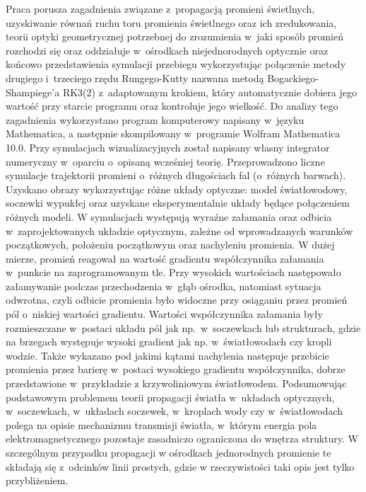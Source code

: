 \documentclass[a4paper,12pkt]{report}
\begin{document}
\indent Praca porusza zagadnienia związane z~propagacją promieni świetlnych, uzyskiwanie równań ruchu toru promienia świetlnego oraz ich zredukowania, teorii optyki geometrycznej potrzebnej do zrozumienia w~jaki sposób promień rozchodzi się oraz oddziałuje w~ośrodkach niejednorodnych optycznie oraz końcowo przedstawienia symulacji przebiegu wykorzystując połączenie metody drugiego i~trzeciego rzędu Rungego-Kutty nazwana metodą Bogackiego-Shampiege’a RK3(2) z~adaptowanym krokiem, który automatycznie dobiera jego wartość przy starcie programu oraz kontroluje jego wielkość. Do analizy tego zagadnienia wykorzystano program komputerowy napisany w~języku Mathematica, a następnie skompilowany w~programie Wolfram Mathematica 10.0. Przy symulacjach wizualizacyjnych został napisany własny integrator numeryczny w~oparciu o~opisaną wcześniej teorię. Przeprowadzono liczne symulacje trajektorii promieni o~różnych długościach fal (o~różnych barwach). Uzyskano obrazy wykorzystując różne układy optyczne: model światłowodowy, soczewki wypukłej oraz uzyskane eksperymentalnie układy będące połączeniem różnych modeli. W symulacjach występują wyraźne załamania oraz odbicia w~zaprojektowanych układzie optycznym, zależne od wprowadzanych warunków początkowych, położeniu początkowym oraz nachyleniu promienia. W dużej mierze, promień reagował na wartość gradientu współczynnika załamania w~punkcie na zaprogramowanym tle. Przy wysokich wartościach następowało załamywanie podczas przechodzenia w~głąb ośrodka, natomiast sytuacja odwrotna, czyli odbicie promienia było widoczne przy osiąganiu przez promień pól o~niskiej wartości gradientu. Wartości współczynnika załamania były rozmieszczane w~postaci układu pól jak np.~w~soczewkach lub strukturach, gdzie na brzegach występuje wysoki gradient jak np. w~światłowodach czy kropli wodzie. Także wykazano pod jakimi kątami nachylenia następuje przebicie promienia przez barierę w~postaci wysokiego gradientu współczynnika, dobrze przedstawione w~przykładzie z krzywoliniowym światłowodem. Podsumowując podstawowym problemem teorii propagacji światła w~układach optycznych, w~soczewkach, w~układach soczewek, w~kroplach wody czy w~światłowodach polega na opisie mechanizmu transmisji światła, w~którym energia pola elektromagnetycznego pozostaje zasadniczo ograniczona do wnętrza struktury. W szczególnym przypadku propagacji w ośrodkach jednorodnych promienie te składają się z~odcinków linii prostych, gdzie w rzeczywistości taki opis jest tylko przybliżeniem.

%
%
\end{document}
